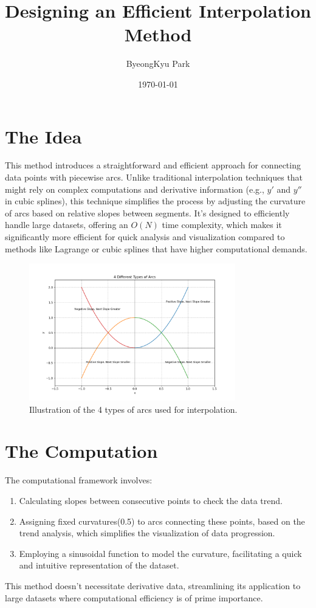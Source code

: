 \documentclass{article}
\title{Designing an Efficient Interpolation Method}
\author{ByeongKyu Park}
\date{\today}
\begin{document}
\maketitle

\section{The Idea}
This method introduces a straightforward and efficient approach for connecting data points with piecewise arcs. Unlike traditional interpolation techniques that might rely on complex computations and derivative information (e.g., $y'$ and $y''$ in cubic splines), this technique simplifies the process by adjusting the curvature of arcs based on relative slopes between segments. It's designed to efficiently handle large datasets, offering an $O(N)$ time complexity, which makes it significantly more efficient for quick analysis and visualization compared to methods like Lagrange or cubic splines that have higher computational demands.

\begin{figure}[htbp]
\centering
\includegraphics[width=0.8\textwidth]{4_arc_types.png}
\caption{Illustration of the 4 types of arcs used for interpolation.}
\end{figure}

\section{The Computation}
The computational framework involves:
\begin{enumerate}
    \item Calculating slopes between consecutive points to check the data trend.
    \item Assigning fixed curvatures(0.5) to arcs connecting these points, based on the trend analysis, which simplifies the visualization of data progression.
    \item Employing a sinusoidal function to model the curvature, facilitating a quick and intuitive representation of the dataset.
\end{enumerate}
This method doesn't necessitate derivative data, streamlining its application to large datasets where computational efficiency is of prime importance.
\end{document}
